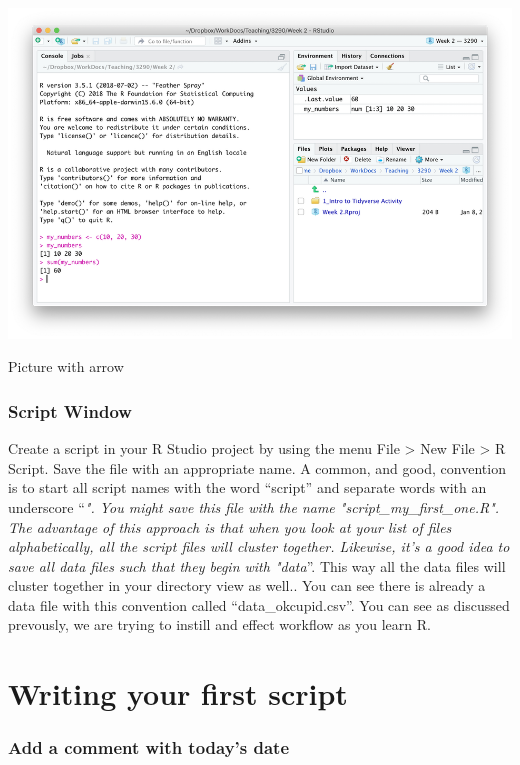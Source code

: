 \documentclass[
]{krantz}
\begin{document}
\includegraphics[width=1\linewidth]{first_time/images/console}

Picture with arrow

\hypertarget{script-window}{%
\subsubsection{Script Window}\label{script-window}}

Create a script in your R Studio project by using the menu File \textgreater{} New File \textgreater{} R Script.
Save the file with an appropriate name. A common, and good, convention is to start all script names with the word ``script'' and separate words with an underscore ``\emph{". You might save this file with the name "script\_my\_first\_one.R". The advantage of this approach is that when you look at your list of files alphabetically, all the script files will cluster together. Likewise, it's a good idea to save all data files such that they begin with "data}''. This way all the data files will cluster together in your directory view as well.. You can see there is already a data file with this convention called ``data\_okcupid.csv''. You can see as discussed prevously, we are trying to instill and effect workflow as you learn R.

\hypertarget{writing-your-first-script}{%
\section{Writing your first script}\label{writing-your-first-script}}

\hypertarget{add-a-comment-with-todays-date}{%
\subsubsection{Add a comment with today's date}\label{add-a-comment-with-todays-date}}
\end{document}
